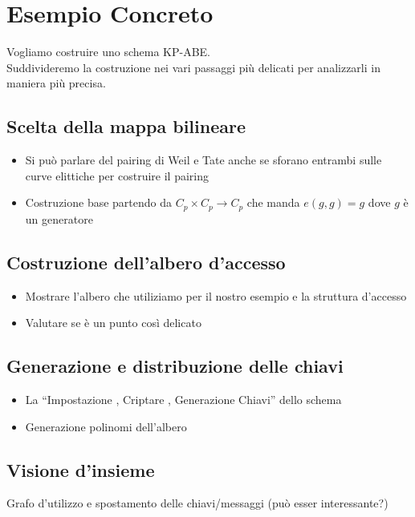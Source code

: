 \chapter{Esempio Concreto}

Vogliamo costruire uno schema KP-ABE.\\
Suddivideremo la costruzione nei vari passaggi più delicati per analizzarli in maniera più precisa.

\section{Scelta della mappa bilineare}

\begin{itemize}
	\item Si può parlare del pairing di Weil e Tate anche se sforano entrambi sulle curve elittiche per costruire il pairing
	\item Costruzione base partendo da $C_p \times C_p \rightarrow C_p$ che manda $e(g,g) = g$ dove $g$ è un generatore
\end{itemize}

\section{Costruzione dell'albero d'accesso}

\begin{itemize}
	\item Mostrare l'albero che utiliziamo per il nostro esempio e la struttura d'accesso
	\item Valutare se è un punto così delicato
\end{itemize}

\section{Generazione e distribuzione delle chiavi}

\begin{itemize}
	\item La ``Impostazione , Criptare , Generazione Chiavi'' dello schema
	\item Generazione polinomi dell'albero 
\end{itemize}

\section{Visione d'insieme}

Grafo d'utilizzo e spostamento delle chiavi/messaggi (può esser interessante?)